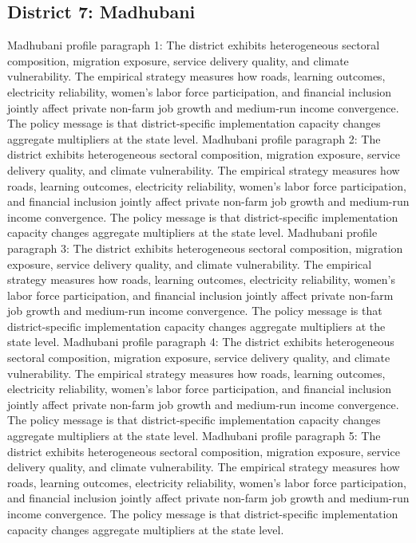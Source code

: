 \documentclass[preprint,12pt]{elsarticle}
\begin{document}
\subsection{District 7: Madhubani}
Madhubani profile paragraph 1: The district exhibits heterogeneous sectoral composition, migration exposure, service delivery quality, and climate vulnerability. The empirical strategy measures how roads, learning outcomes, electricity reliability, women's labor force participation, and financial inclusion jointly affect private non-farm job growth and medium-run income convergence. The policy message is that district-specific implementation capacity changes aggregate multipliers at the state level.
Madhubani profile paragraph 2: The district exhibits heterogeneous sectoral composition, migration exposure, service delivery quality, and climate vulnerability. The empirical strategy measures how roads, learning outcomes, electricity reliability, women's labor force participation, and financial inclusion jointly affect private non-farm job growth and medium-run income convergence. The policy message is that district-specific implementation capacity changes aggregate multipliers at the state level.
Madhubani profile paragraph 3: The district exhibits heterogeneous sectoral composition, migration exposure, service delivery quality, and climate vulnerability. The empirical strategy measures how roads, learning outcomes, electricity reliability, women's labor force participation, and financial inclusion jointly affect private non-farm job growth and medium-run income convergence. The policy message is that district-specific implementation capacity changes aggregate multipliers at the state level.
Madhubani profile paragraph 4: The district exhibits heterogeneous sectoral composition, migration exposure, service delivery quality, and climate vulnerability. The empirical strategy measures how roads, learning outcomes, electricity reliability, women's labor force participation, and financial inclusion jointly affect private non-farm job growth and medium-run income convergence. The policy message is that district-specific implementation capacity changes aggregate multipliers at the state level.
Madhubani profile paragraph 5: The district exhibits heterogeneous sectoral composition, migration exposure, service delivery quality, and climate vulnerability. The empirical strategy measures how roads, learning outcomes, electricity reliability, women's labor force participation, and financial inclusion jointly affect private non-farm job growth and medium-run income convergence. The policy message is that district-specific implementation capacity changes aggregate multipliers at the state level.
\end{document}
